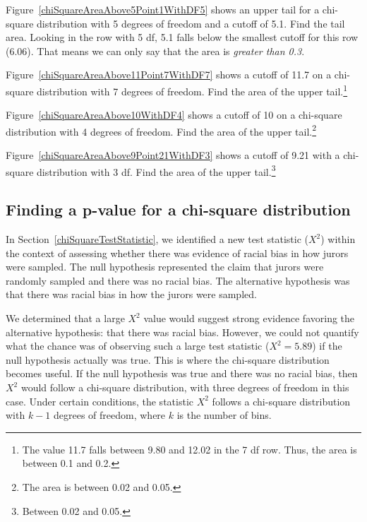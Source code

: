 \begin{example}{Figure~\ref{chiSquareAreaAbove5Point1WithDF5} shows an upper tail for a chi-square distribution with 5 degrees of freedom and a cutoff of 5.1. Find the tail area.}
Looking in the row with 5 df, 5.1 falls below the smallest cutoff for this row (6.06). That means we can only say that the area is \emph{greater than 0.3}.
\end{example}

\begin{exercise}
Figure~\ref{chiSquareAreaAbove11Point7WithDF7} shows a cutoff of 11.7 on a chi-square distribution with 7 degrees of freedom. Find the area of the upper tail.\footnote{The value 11.7 falls between 9.80 and 12.02 in the 7 df row. Thus, the area is between 0.1 and 0.2.}
\end{exercise}

\begin{exercise}
Figure~\ref{chiSquareAreaAbove10WithDF4} shows a cutoff of 10 on a chi-square distribution with 4 degrees of freedom. Find the area of the upper tail.\footnote{The area is between 0.02 and 0.05.}
\end{exercise}

\begin{exercise}
Figure~\ref{chiSquareAreaAbove9Point21WithDF3} shows a cutoff of 9.21 with a chi-square distribution with 3 df. Find the area of the upper tail.\footnote{Between 0.02 and 0.05.}
\end{exercise}


\subsection{Finding a p-value for a chi-square distribution}
\label{pValueForAChiSquareTest}

In Section~\ref{chiSquareTestStatistic}, we identified a new test statistic ($X^2$) within the context of assessing whether there was evidence of racial bias in how jurors were sampled. The null hypothesis represented the claim that jurors were randomly sampled and there was no racial bias. The alternative hypothesis was that there was racial bias in how the jurors were sampled.

We determined that a large $X^2$ value would suggest strong evidence favoring the alternative hypothesis: that there was racial bias. However, we could not quantify what the chance was of observing such a large test statistic ($X^2=5.89$) if the null hypothesis actually was true. This is where the chi-square distribution becomes useful. If the null hypothesis was true and there was no racial bias, then $X^2$ would follow a chi-square distribution, with three degrees of freedom in this case. Under certain conditions, the statistic $X^2$ follows a chi-square distribution with $k - 1$ degrees of freedom, where $k$ is the number of bins.

